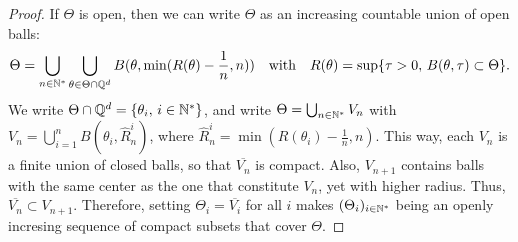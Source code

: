 \begin{proof}
    If $\Theta$ is open,
    then we can write $\Theta$ as an increasing countable union of open balls: %
        \begin{equation}
            \Theta = \bigcup_{n\in\mathbb{N}^\ast}\bigcup_{\theta\in\Theta\cap\mathbb{Q}^d} B(\theta, \min(R(\theta)-\frac{1}{n},n) ) \quad \text{with} \quad R(\theta) = \sup\{\tau>0,\,B(\theta,\tau)\subset\Theta\}. 
        \end{equation}
    We write $\Theta\cap\mathbb{Q}^d=\{\theta_i,\,i\in\mathbb{N}^\ast\}$, and write $\Theta=\bigcup_{n\in\mathbb{N}^\ast}V_n$ with $V_n=\bigcup_{i=1}^nB(\theta_i,\hat R^i_n)$, where $\hat R^i_n =\min(R(\theta_i)-\frac{1}{n},n)$. This way, each $V_n$ is a finite union of closed balls, so that $\overline{V_n}$ is compact. Also, $V_{n+1}$ contains balls with the same center as the one that constitute $V_n$, yet with higher radius. Thus, $\overline{V_n}\subset V_{n+1}$. Therefore, setting $\Theta_i=\overline{V_i}$ for all $i$ makes $(\Theta_i)_{i\in\mathbb{N}^\ast}$ being an openly incresing sequence of compact subsets that cover $\Theta$.


\end{proof}
